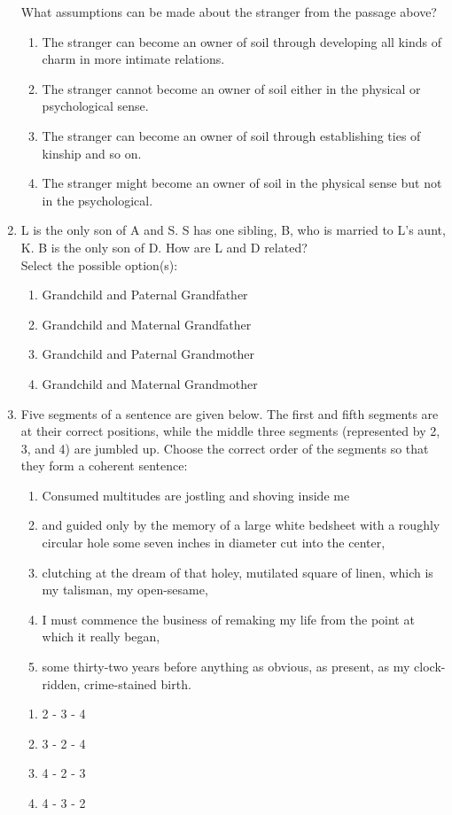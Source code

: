 \documentclass[journal,13pt,onecolumn]{exam}
\theoremstyle{remark}
\begin{document}
\begin{enumerate}[label=Q.\arabic*]
What assumptions can be made about the stranger from the passage above?

\begin{enumerate}
    \item The stranger can become an owner of soil through developing all kinds of charm in more intimate relations.
    \item The stranger cannot become an owner of soil either in the physical or psychological sense.
    \item The stranger can become an owner of soil through establishing ties of kinship and so on.
    \item The stranger might become an owner of soil in the physical sense but not in the psychological.
\end{enumerate} 

\item L is the only son of A and S. S has one sibling, B, who is married to L's aunt, K. B is the only son of D. How are L and D related? \\

Select the possible option(s):

\begin{enumerate}
    \item Grandchild and Paternal Grandfather
    \item Grandchild and Maternal Grandfather
    \item Grandchild and Paternal Grandmother
    \item Grandchild and Maternal Grandmother
\end{enumerate}

\item  Five segments of a sentence are given below. The first and fifth segments are at their correct positions, while the middle three segments (represented by 2, 3, and 4) are jumbled up. Choose the correct order of the segments so that they form a coherent sentence:

\begin{enumerate}[label=(\arabic*)]
    \item Consumed multitudes are jostling and shoving inside me
    \item and guided only by the memory of a large white bedsheet with a roughly circular hole some seven inches in diameter cut into the center,
    \item clutching at the dream of that holey, mutilated square of linen, which is my talisman, my open-sesame,
    \item I must commence the business of remaking my life from the point at which it really began,
    \item some thirty-two years before anything as obvious, as present, as my clock-ridden, crime-stained birth. 
\end{enumerate}
\begin{enumerate}
    \item 2 - 3 - 4
    \item 3 - 2 - 4
    \item 4 - 2 - 3
    \item 4 - 3 - 2
\end{enumerate}


\end{enumerate}
\end{document}
